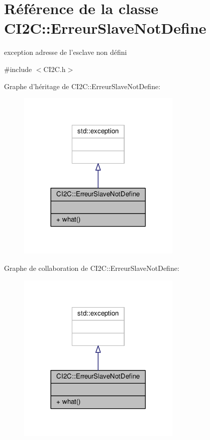 \hypertarget{classCI2C_1_1ErreurSlaveNotDefine}{\section{Référence de la classe C\+I2\+C\+:\+:Erreur\+Slave\+Not\+Define}
\label{classCI2C_1_1ErreurSlaveNotDefine}
}


exception adresse de l'esclave non défini  




{\ttfamily \#include $<$C\+I2\+C.\+h$>$}



Graphe d'héritage de C\+I2\+C\+:\+:Erreur\+Slave\+Not\+Define\+:\nopagebreak
\begin{figure}[H]
\begin{center}
\leavevmode
\includegraphics[width=221pt]{classCI2C_1_1ErreurSlaveNotDefine__inherit__graph}
\end{center}
\end{figure}


Graphe de collaboration de C\+I2\+C\+:\+:Erreur\+Slave\+Not\+Define\+:\nopagebreak
\begin{figure}[H]
\begin{center}
\leavevmode
\includegraphics[width=221pt]{classCI2C_1_1ErreurSlaveNotDefine__coll__graph}
\end{center}
\end{figure}
